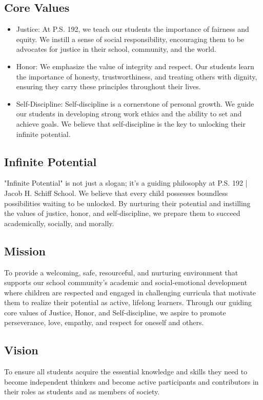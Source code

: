\documentclass[11pt]{article}
\begin{document}
\subsection{Core Values}
\label{sec:org3f01635}
\begin{itemize}
\item Justice: At P.S. 192, we teach our students the importance of fairness and equity. We instill a sense of social responsibility, encouraging them to be advocates for justice in their school, community, and the world.
\item Honor: We emphasize the value of integrity and respect. Our students learn the importance of honesty, trustworthiness, and treating others with dignity, ensuring they carry these principles throughout their lives.
\item Self-Discipline: Self-discipline is a cornerstone of personal growth. We guide our students in developing strong work ethics and the ability to set and achieve goals. We believe that self-discipline is the key to unlocking their infinite potential.
\end{itemize}

\subsection{Infinite Potential}
\label{sec:org2304fab}
"Infinite Potential" is not just a slogan; it's a guiding philosophy at P.S. 192 | Jacob H. Schiff School. We believe that every child possesses boundless possibilities waiting to be unlocked. By nurturing their potential and instilling the values of justice, honor, and self-discipline, we prepare them to succeed academically, socially, and morally.

\subsection{Mission}
\label{sec:org751249b}
To provide a welcoming, safe, resourceful, and nurturing environment that supports our school community's academic and social-emotional development where children are respected and engaged in challenging curricula that motivate them to realize their potential as active, lifelong learners. Through our guiding core values of Justice, Honor, and Self-discipline, we aspire to promote perseverance, love, empathy, and respect for oneself and others.

\subsection{Vision}
\label{sec:orgd8a6419}
To ensure all students acquire the essential knowledge and skills they need to become independent thinkers and become active participants and contributors in their roles as students and as members of society.
\end{document}
